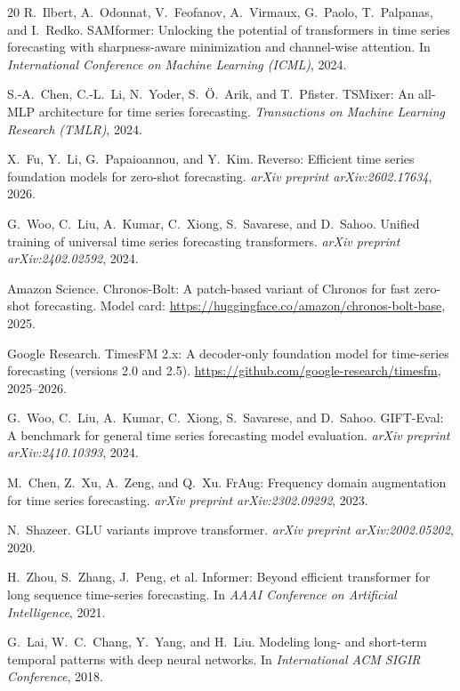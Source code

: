 \documentclass[11pt]{article}
\begin{document}
\begin{thebibliography}{20}
R.~Ilbert, A.~Odonnat, V.~Feofanov, A.~Virmaux, G.~Paolo, T.~Palpanas, and I.~Redko.
\newblock SAMformer: Unlocking the potential of transformers in time series forecasting with sharpness-aware minimization and channel-wise attention.
\newblock In \emph{International Conference on Machine Learning (ICML)}, 2024.

S.-A.~Chen, C.-L.~Li, N.~Yoder, S.~{\"O}.~Arik, and T.~Pfister.
\newblock TSMixer: An all-MLP architecture for time series forecasting.
\newblock \emph{Transactions on Machine Learning Research (TMLR)}, 2024.

X.~Fu, Y.~Li, G.~Papaioannou, and Y.~Kim.
\newblock Reverso: Efficient time series foundation models for zero-shot forecasting.
\newblock \emph{arXiv preprint arXiv:2602.17634}, 2026.

G.~Woo, C.~Liu, A.~Kumar, C.~Xiong, S.~Savarese, and D.~Sahoo.
\newblock Unified training of universal time series forecasting transformers.
\newblock \emph{arXiv preprint arXiv:2402.02592}, 2024.

Amazon Science.
\newblock Chronos-Bolt: A patch-based variant of Chronos for fast zero-shot forecasting.
\newblock Model card: \url{https://huggingface.co/amazon/chronos-bolt-base}, 2025.

Google Research.
\newblock TimesFM 2.x: A decoder-only foundation model for time-series forecasting (versions 2.0 and 2.5).
\newblock \url{https://github.com/google-research/timesfm}, 2025--2026.

G.~Woo, C.~Liu, A.~Kumar, C.~Xiong, S.~Savarese, and D.~Sahoo.
\newblock GIFT-Eval: A benchmark for general time series forecasting model evaluation.
\newblock \emph{arXiv preprint arXiv:2410.10393}, 2024.

M.~Chen, Z.~Xu, A.~Zeng, and Q.~Xu.
\newblock FrAug: Frequency domain augmentation for time series forecasting.
\newblock \emph{arXiv preprint arXiv:2302.09292}, 2023.

N.~Shazeer.
\newblock GLU variants improve transformer.
\newblock \emph{arXiv preprint arXiv:2002.05202}, 2020.

H.~Zhou, S.~Zhang, J.~Peng, et al.
\newblock Informer: Beyond efficient transformer for long sequence time-series forecasting.
\newblock In \emph{AAAI Conference on Artificial Intelligence}, 2021.

G.~Lai, W.~C.~Chang, Y.~Yang, and H.~Liu.
\newblock Modeling long- and short-term temporal patterns with deep neural networks.
\newblock In \emph{International ACM SIGIR Conference}, 2018.


\end{thebibliography}
\end{document}
